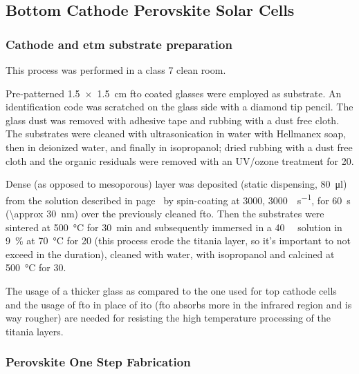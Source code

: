 	\subsection{Bottom Cathode Perovskite Solar Cells}

		\subsubsection{Cathode and \gls{etm} substrate preparation}
			This process was performed in a class 7 clean room.
		
			Pre-patterned \SI{1.5 x 1.5}{\cm} \gls{fto} coated glasses were employed as substrate. An identification code was scratched on the glass side with a diamond tip pencil. The glass dust was removed with adhesive tape and rubbing with a dust free cloth. The substrates were cleaned with ultrasonication in water with Hellmanex soap, then in deionized water, and finally in isopropanol; dried rubbing with a dust free cloth and the organic residuals were removed with an UV/ozone treatment for \SI{20}{\min}.
			
			Dense (as opposed to mesoporous) \TiOtwo layer was deposited (static dispensing, \SI{80}{\ul}) from the solution described in page~\pageref{precursors_tio2} by spin-coating at \SI{3000}{\rpm}, \SI{3000}{\rpm\per\s}, for \SI{60}{\s} (\SI{\approx 30}{\nm}) over the previously cleaned \gls{fto}. Then
			the substrates were sintered at \SI{500}{\celsius} for \SI{30}{\minute} and subsequently immersed in a \SI{40}{\milli\Molar}
			 solution in 9~\%  at \SI{70}{\celsius} for \SI{20}{\min} (this process erode the titania layer, so it's important to not exceed in the duration), cleaned with water, with isopropanol and	calcined at \SI{500}{\celsius} for \SI{30}{\min}.
			
 			The usage of a thicker glass as compared to the one used for top cathode cells and the usage of \gls{fto} in place of \gls{ito} (\gls{fto} absorbs more in the infrared region and is way rougher) are needed for resisting the high temperature processing of the titania layers.
 			
			
		\subsubsection{ Perovskite One Step Fabrication}
		
